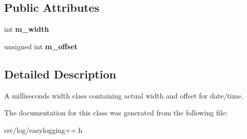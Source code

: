 \subsection*{Public Attributes}
\begin{DoxyCompactItemize}
\item 
int {\bfseries m\+\_\+width}\hypertarget{classel_1_1base_1_1MillisecondsWidth_a31c468b0323d376505c4975720c7b66e}{}\label{classel_1_1base_1_1MillisecondsWidth_a31c468b0323d376505c4975720c7b66e}

\item 
unsigned int {\bfseries m\+\_\+offset}\hypertarget{classel_1_1base_1_1MillisecondsWidth_a0e98edbecf602a915d4d609747c52669}{}\label{classel_1_1base_1_1MillisecondsWidth_a0e98edbecf602a915d4d609747c52669}

\end{DoxyCompactItemize}


\subsection{Detailed Description}
A milliseconds width class containing actual width and offset for date/time. 

The documentation for this class was generated from the following file\+:\begin{DoxyCompactItemize}
\item 
src/log/easylogging++.\+h\end{DoxyCompactItemize}
